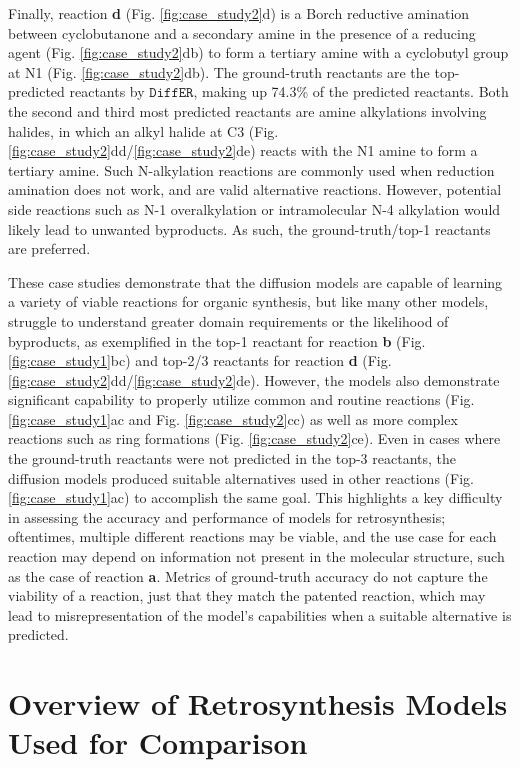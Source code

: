 \documentclass{article}
\newcommand{\ours}{$\texttt{DiffER}$\xspace}
\begin{document}
Finally, reaction \textbf{d} (Fig. \ref{fig:case_study2}d) is a Borch reductive amination \cite{borch2003reductive} between cyclobutanone and a secondary amine in the presence of a reducing agent (Fig. \ref{fig:case_study2}db) to form a tertiary amine with a cyclobutyl group at N1 (Fig. \ref{fig:case_study2}db). The ground-truth reactants are the top-predicted reactants by \ours, making up 74.3\% of the predicted reactants. Both the second and third most predicted reactants are amine alkylations involving halides, in which an alkyl halide at C3 (Fig. \ref{fig:case_study2}dd/\ref{fig:case_study2}de) reacts with the N1 amine to form a tertiary amine. Such N-alkylation  reactions are commonly used when reduction amination does not work, and are valid alternative reactions. However, potential side reactions such as N-1 overalkylation or intramolecular N-4 alkylation would likely lead to unwanted byproducts. As such, the ground-truth/top-1 reactants are preferred.

These case studies demonstrate that the diffusion models are capable of learning a variety of viable reactions for organic synthesis, but like many other models, struggle to understand greater domain requirements or the likelihood of byproducts, as exemplified in the top-1 reactant for reaction \textbf{b} (Fig. \ref{fig:case_study1}bc) and top-2/3 reactants for reaction \textbf{d} (Fig. \ref{fig:case_study2}dd/\ref{fig:case_study2}de). However, the models also demonstrate significant capability to properly utilize common and routine reactions (Fig. \ref{fig:case_study1}ac and Fig. \ref{fig:case_study2}cc) as well as more complex reactions such as ring formations (Fig. \ref{fig:case_study2}ce). Even in cases where the ground-truth reactants were not predicted in the top-3 reactants, the diffusion models produced suitable alternatives used in other reactions (Fig. \ref{fig:case_study1}ac) to accomplish the same goal. This highlights a key difficulty in assessing the accuracy and performance of models for retrosynthesis; oftentimes, multiple different reactions may be viable, and the use case for each reaction may depend on information not present in the molecular structure, such as the case of reaction \textbf{a}. Metrics of ground-truth accuracy do not capture the viability of a reaction, just that they match the patented reaction, which may lead to misrepresentation of the model's capabilities when a suitable alternative is predicted.

\section{Overview of Retrosynthesis Models Used for Comparison}
\label{sec:A1}
\end{document}
